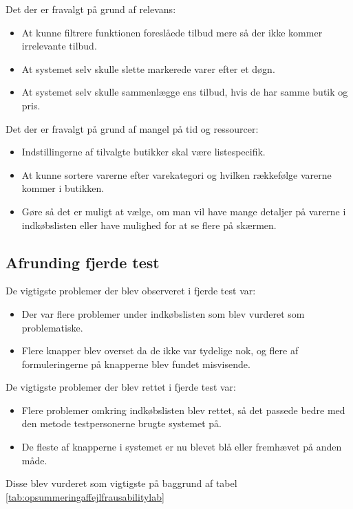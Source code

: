 Det der er fravalgt på grund af relevans:
\begin{itemize}
\item At kunne filtrere funktionen foreslåede tilbud mere så der ikke kommer irrelevante tilbud.
\item At systemet selv skulle slette markerede varer efter et døgn.
\item At systemet selv skulle sammenlægge ens tilbud, hvis de har samme butik og pris.
\end{itemize}
Det der er fravalgt på grund af mangel på tid og ressourcer:
\begin{itemize}
\item Indstillingerne af tilvalgte butikker skal være listespecifik. 
\item At kunne sortere varerne efter varekategori og hvilken rækkefølge varerne kommer i butikken.
\item Gøre så det er muligt at vælge, om man vil have mange detaljer på varerne i indkøbslisten eller have mulighed for at se flere på skærmen.
\end{itemize}

\subsection{Afrunding fjerde test}
De vigtigste problemer der blev observeret i fjerde test var:
\begin{itemize}
\item Der var flere problemer under indkøbslisten som blev vurderet som problematiske.
\item Flere knapper blev overset da de ikke var tydelige nok, og flere af formuleringerne på knapperne blev fundet misvisende.
\end{itemize}
De vigtigste problemer der blev rettet i fjerde test var:
\begin{itemize}
\item Flere problemer omkring indkøbslisten blev rettet, så det passede bedre med den metode testpersonerne brugte systemet på.
\item De fleste af knapperne i systemet er nu blevet blå eller fremhævet på anden måde.
\end{itemize}
Disse blev vurderet som vigtigste på baggrund af tabel \ref{tab:opsummeringaffejlfrausabilitylab}